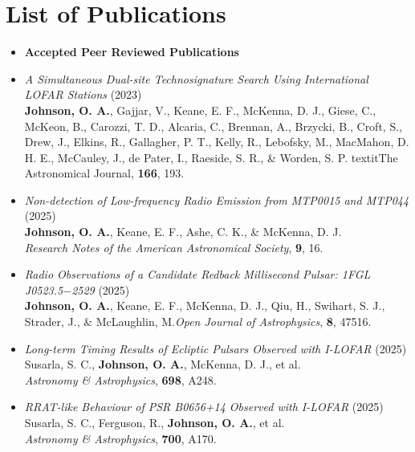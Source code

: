 \chapter*{List of Publications}

\begin{itemize}

    \item[] \textbf{Accepted Peer Reviewed Publications}

    \item[] \textit{A Simultaneous Dual-site Technosignature Search Using International LOFAR Stations} (2023)\\
    \textbf{Johnson, O. A.}, Gajjar, V., Keane, E. F., McKenna, D. J., Giese, C., McKeon, B., Carozzi, T. D., Alcaria, C., Brennan, A., Brzycki, B., Croft, S., Drew, J., Elkins, R., Gallagher, P. T., Kelly, R., Lebofsky, M., MacMahon, D. H. E., McCauley, J., de Pater, I., Raeside, S. R., \& Worden, S. P. textit{The Astronomical Journal}, \textbf{166}, 193.

    \item[] \textit{Non-detection of Low-frequency Radio Emission from MTP0015 and MTP044} (2025)\\
    \textbf{Johnson, O. A.}, Keane, E. F., Ashe, C. K., \& McKenna, D. J.\\
    \textit{Research Notes of the American Astronomical Society}, \textbf{9}, 16.

    \item[] \textit{Radio Observations of a Candidate Redback Millisecond Pulsar: 1FGL J0523.5$-$2529} (2025)\\
    \textbf{Johnson, O. A.}, Keane, E. F., McKenna, D. J., Qiu, H., Swihart, S. J., Strader, J., \& McLaughlin, M.\textit{Open Journal of Astrophysics}, \textbf{8}, 47516.

    \item[] \textit{Long-term Timing Results of Ecliptic Pulsars Observed with I-LOFAR} (2025)\\
    Susarla, S. C., \textbf{Johnson, O. A.}, McKenna, D. J., et al.\\
    \textit{Astronomy \& Astrophysics}, \textbf{698}, A248.

    \item[] \textit{RRAT-like Behaviour of PSR B0656+14 Observed with I-LOFAR} (2025)\\
    Susarla, S. C., Ferguson, R., \textbf{Johnson, O. A.}, et al.\\
    \textit{Astronomy \& Astrophysics}, \textbf{700}, A170.


\end{itemize}
